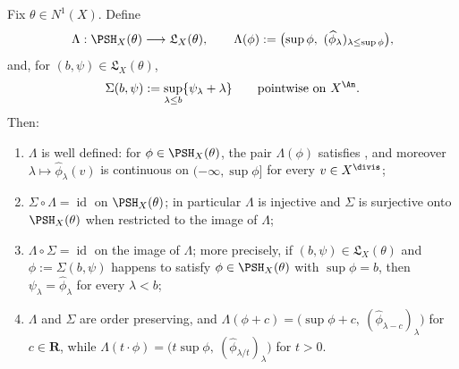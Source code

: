\begin{theorem}
\label{thm:ch35-translation}
Fix $\theta\in N^1(X)$.  Define
\[
 \Lambda:\PSH_X(\theta)\longrightarrow\mathfrak L_X(\theta),
 \qquad
 \Lambda(\phi):=\bigl(\sup\phi,\ (\widehat\phi_\lambda)_{\lambda\leq\sup\phi}\bigr),
\]
and, for $(b,\psi)\in\mathfrak L_X(\theta)$,
\[
 \Sigma(b,\psi):=\sup_{\lambda\leq b}\{\psi_\lambda+\lambda\}
 \qquad\text{pointwise on }X^{\An}.
\]
Then:
\begin{enumerate}
\item $\Lambda$ is well defined: for
 $\phi\in\PSH_X(\theta)$, the pair $\Lambda(\phi)$ satisfies
 , and moreover
 $\lambda\mapsto\widehat\phi_\lambda(v)$ is continuous on
 $(-\infty,\sup\phi]$ for every $v\in X^{\divis}$;
\item $\Sigma\circ\Lambda=\operatorname{id}$ on
 $\PSH_X(\theta)$; in particular $\Lambda$ is injective and
 $\Sigma$ is surjective onto $\PSH_X(\theta)$ when restricted to the
 image of $\Lambda$;
\item $\Lambda\circ\Sigma=\operatorname{id}$ on the image of
 $\Lambda$; more precisely, if
 $(b,\psi)\in\mathfrak L_X(\theta)$ and
 $\phi:=\Sigma(b,\psi)$ happens to satisfy
 $\phi\in\PSH_X(\theta)$ with $\sup\phi=b$, then
 $\psi_\lambda=\widehat\phi_\lambda$ for every $\lambda<b$;
\item $\Lambda$ and $\Sigma$ are order preserving, and
 $\Lambda(\phi+c)=\bigl(\sup\phi+c,\ (\widehat\phi_{\lambda-c})_{\lambda}\bigr)$
 for $c\in\mathbf R$, while
 $\Lambda(t\cdot\phi)=\bigl(t\sup\phi,\ (\widehat\phi_{\lambda/t})_\lambda\bigr)$
 for $t>0$.
\end{enumerate}
\par
\end{theorem}

